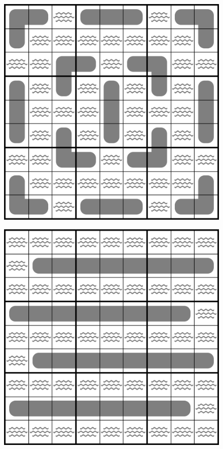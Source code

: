 \begin{figure}
\centering
\begin{minipage}{.5\textwidth}
  \centering
  \includegraphics[width=.8\textwidth]{Figures/13Islands.png}
  \label{fig:13Islands}
\end{minipage}%
\begin{minipage}{.5\textwidth}
  \centering
  \includegraphics[width=.8\textwidth]{Figures/DeepestFlood.png}
  \label{fig:DeepestFlood}
\end{minipage}
\end{figure}

